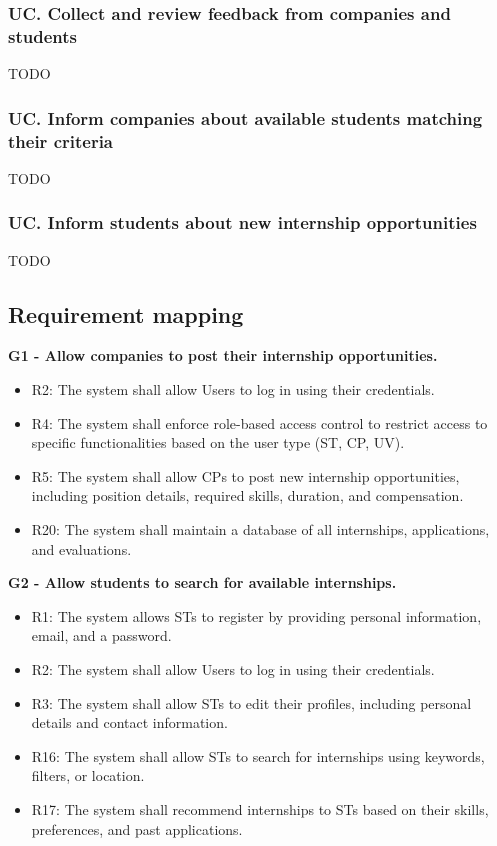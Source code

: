 \subsubsection*{UC\cuc . Collect and review feedback from companies and students}
TODO

\subsubsection*{UC\cuc . Inform companies about available students matching their criteria}
TODO

\subsubsection*{UC\cuc . Inform students about new internship opportunities}
TODO

\newpage

\subsection{Requirement mapping}
\label{subsec:requirement_mapping}%
\textbf{G1 - Allow companies to post their internship opportunities.}
\begin{itemize}
    \item R2: The system shall allow Users to log in using their credentials.
    \item R4: The system shall enforce role-based access control to restrict access to specific functionalities based on the user type (ST, CP, UV).
    \item R5: The system shall allow CPs to post new internship opportunities, including position details, required skills, duration, and compensation.
    \item R20: The system shall maintain a database of all internships, applications, and evaluations.
\end{itemize}

\vspace{1.5cm}
\textbf{G2 - Allow students to search for available internships.}
\begin{itemize}
    \item R1: The system allows STs to register by providing personal information, email, and a password.
    \item R2: The system shall allow Users to log in using their credentials.
    \item R3: The system shall allow STs to edit their profiles, including personal details and contact information.
    \item R16: The system shall allow STs to search for internships using keywords, filters, or location.
    \item R17: The system shall recommend internships to STs based on their skills, preferences, and past applications.
\end{itemize}

